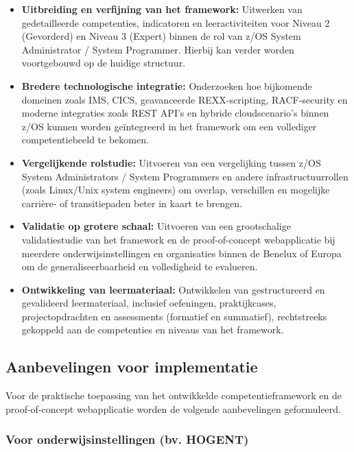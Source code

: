 \begin{itemize}
	\item \textbf{Uitbreiding en verfijning van het framework:}  
	Uitwerken van gedetailleerde competenties, indicatoren en leeractiviteiten voor Niveau 2 (Gevorderd) en Niveau 3 (Expert) binnen de rol van z/OS System Administrator / System Programmer. Hierbij kan verder worden voortgebouwd op de huidige structuur.
	
	\item \textbf{Bredere technologische integratie:}  
	Onderzoeken hoe bijkomende domeinen zoals IMS, CICS, geavanceerde REXX-scripting, RACF-security en moderne integraties zoals REST API’s en hybride cloudscenario’s binnen z/OS kunnen worden geïntegreerd in het framework om een vollediger competentiebeeld te bekomen.
	
	\item \textbf{Vergelijkende rolstudie:}  
	Uitvoeren van een vergelijking tussen z/OS System Administrators / System Programmers en andere infrastructuurrollen (zoals Linux/Unix system engineers) om overlap, verschillen en mogelijke carrière- of transitiepaden beter in kaart te brengen.
	
	\item \textbf{Validatie op grotere schaal:}  
	Uitvoeren van een grootschalige validatiestudie van het framework en de proof-of-concept webapplicatie bij meerdere onderwijsinstellingen en organisaties binnen de Benelux of Europa om de generaliseerbaarheid en volledigheid te evalueren.
	
	\item \textbf{Ontwikkeling van leermateriaal:}  
	Ontwikkelen van gestructureerd en gevalideerd leermateriaal, inclusief oefeningen, praktijkcases, projectopdrachten en assessments (formatief en summatief), rechtstreeks gekoppeld aan de competenties en niveaus van het framework.
\end{itemize}

\subsection{Aanbevelingen voor implementatie}

Voor de praktische toepassing van het ontwikkelde competentieframework en de proof-of-concept webapplicatie worden de volgende aanbevelingen geformuleerd.

\subsubsection{Voor onderwijsinstellingen (bv. HOGENT)}

